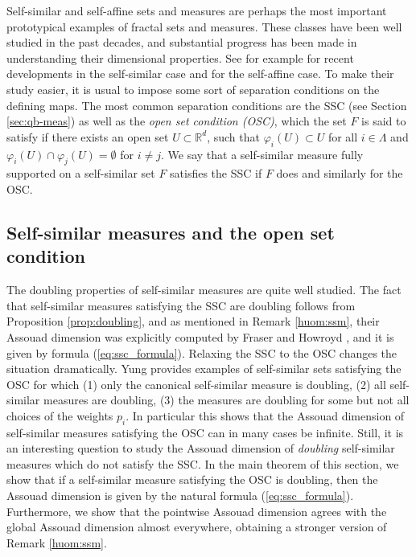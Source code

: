 \documentclass{PRM}
\newcommand{\field}[1]{\mathbb{#1}}
\newcommand{\R}{\field{R}}
\theoremstyle{plain}
\theoremstyle{definition}
\theoremstyle{remark}
\begin{document}
Self-similar and self-affine sets and measures are perhaps the most important prototypical examples of fractal sets and measures. These classes have been well studied in the past decades, and substantial progress has been made in understanding their dimensional properties. See for example \cite{Hoch} for recent developments in the self-similar case and \cite{BHR, HR} for the self-affine case. To make their study easier, it is usual to impose some sort of separation conditions on the defining maps. The most common separation conditions are the SSC (see Section \ref{sec:qb-meas}) as well as the \emph{open set condition (OSC)}, which the set $F$ is said to satisfy if there exists an open set $U\subset \R^d$, such that $\varphi_i(U)\subset U$ for all $i\in\Lambda$ and $\varphi_i(U)\cap \varphi_j(U)=\emptyset$ for $i\ne j$. We say that a self-similar measure fully supported on a self-similar set $F$ satisfies the SSC if $F$ does and similarly for the OSC.

\subsection{Self-similar measures and the open set condition}
The doubling properties of self-similar measures are quite well studied. The fact that self-similar measures satisfying the SSC are doubling follows from Proposition \ref{prop:doubling}, and as mentioned in Remark \ref{huom:ssm}, their Assouad dimension was explicitly computed by Fraser and Howroyd \cite{FH}, and it is given by formula (\ref{eq:ssc_formula}). Relaxing the SSC to the OSC changes the situation dramatically. Yung \cite{Yung} provides examples of self-similar sets satisfying the OSC for which (1) only the canonical self-similar measure is doubling, (2) all self-similar measures are doubling, (3) the measures are doubling for some but not all choices of the weights $p_i$. In particular this shows that the Assouad dimension of self-similar measures satisfying the OSC can in many cases be infinite. Still, it is an interesting question to study the Assouad dimension of \emph{doubling} self-similar measures which do not satisfy the SSC. In the main theorem of this section, we show that if a self-similar measure satisfying the OSC is doubling, then the Assouad dimension is given by the natural formula (\ref{eq:ssc_formula}). Furthermore, we show that the pointwise Assouad dimension agrees with the global Assouad dimension almost everywhere, obtaining a stronger version of Remark \ref{huom:ssm}.
\end{document}
